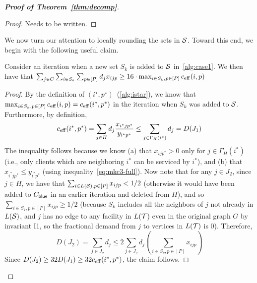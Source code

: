 \begin{proof}[{\bf Proof of Theorem~\ref{thm:decomp}}]
\begin{proof}
Needs to be written.

%
\end{proof}

\medskip \noindent We now turn our attention to locally rounding the sets in ${\cal S}$. Toward this end, we begin with the following useful claim.

\begin{claim}\label{clm:imp}
Consider an iteration when a new set $S_k$ is added to ${\cal S}$ in~\cref{alg:case1}. We then have that $\sum_{j\in C} \sum_{i\in S_k}  \sum_{p\in [P]} d_j x_{ijp} \geq 16\cdot \max_{i\in S_k, p\in [P]} c_{\mathrm{eff}}(i,p) $
\end{claim}
\begin{proof}
By the definition of $(i^\star, p^\star)$~(\cref{alg:istar}), we know that $ \max_{i\in S_k, p\in [P]} c_{\mathrm{eff}}(i,p)  = c_{\mathrm{eff}}(i^*,p^*)$ in the iteration when $S_k$ was added to ${\cal S}$. Furthermore, by definition,
\[c_{\mathrm{eff}}(i^*,p^*) = \sum_{j\in H} d_j \frac{x_{i^*jp^*}}{y_{i^*p^*}} \leq \sum_{j\in \Gamma_H(i^*)} d_j = D(J_1)\]
The inequality follows because we know  (a) that $x_{ijp^*} > 0$ only for $j\in \Gamma_H(i^*)$ (i.e., only clients which are neighboring $i^*$ can be serviced by $i^*$), and (b) that $x_{i^*jp^*} \leq y_{i^*p^*}$ (using inequality~\eqref{eq:mkc3-full}).
Now note that for any $j\in J_2$, since $j\in H$, we have that $\sum_{i\in L({\cal S}), p\in [P]} x_{ijp} < 1/2$ (otherwise it would have been added
to $C_{\mathsf{blue}}$ in an earlier iteration and deleted from $H$), and so $\sum_{i\in S_k, p\in [P]} x_{ijp} \geq 1/2$ (because $S_k$ includes all the neighbors of $j$ not already in $L({\cal S})$, and $j$ has no edge to any facility in $L({\cal T}$) even in the original graph $G$ by invariant I1, so the fractional demand from $j$ to vertices in $L({\cal T})$ is $0$).
Therefore,
\[
D(J_2) = \sum_{j\in J_2} d_j \leq 2 \sum_{j\in J_2} d_j \left(\sum_{i\in S_k, p\in [P]} x_{ijp}\right)
\]
Since $D(J_2) \geq 32D(J_1) \geq 32c_{\mathrm{eff}}(i^*,p^*)$, the claim follows.
\end{proof}



\end{proof}
